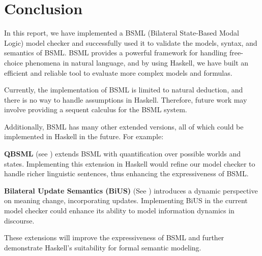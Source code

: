\section{Conclusion}\label{sec:Conclusion}

In this report, we have implemented a BSML (Bilateral State-Based Modal Logic) model checker and successfully used it to validate the models, syntax, and semantics of BSML.\@ 
BSML provides a powerful framework for handling free-choice phenomena in natural language, and by using Haskell, we have built an efficient and reliable tool to evaluate more complex models and formulas.

Currently, the implementation of BSML is limited to natural deduction, and there is no way to handle assumptions in Haskell. 
Therefore, future work may involve providing a sequent calculus for the BSML system.

Additionally, BSML has many other extended versions, all of which could be implemented in Haskell in the future. For example:

\textbf{QBSML} (see \citet{Aloni2023}) extends BSML with quantification over possible worlds and states. Implementing this extension in Haskell would refine our model checker to handle richer linguistic sentences, thus enhancing the expressiveness of BSML.\@

\textbf{Bilateral Update Semantics (BiUS)} (See \citet{BiUS2023}) introduces a dynamic perspective on meaning change, incorporating updates. Implementing BiUS in the current model checker could enhance its ability to model information dynamics in discourse.

These extensions will improve the expressiveness of BSML and further demonstrate Haskell's suitability for formal semantic modeling.
